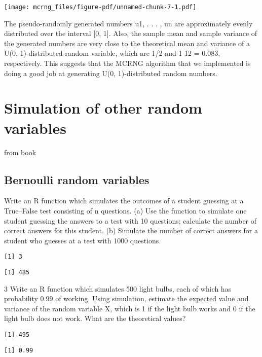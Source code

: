 \documentclass[
  letterpaper,
  DIV=11,
  numbers=noendperiod]{scrreprt}
\begin{document}
\texttt{[image: mcrng\_files/figure-pdf/unnamed-chunk-7-1.pdf]}

The pseudo-randomly generated numbers u1, . . . , un are approximately
evenly distributed over the interval {[}0, 1{]}. Also, the sample mean
and sample variance of the generated numbers are very close to the
theoretical mean and variance of a U(0, 1)-distributed random variable,
which are 1/2 and 1 12 = 0.083, respectively. This suggests that the
MCRNG algorithm that we implemented is doing a good job at generating
U(0, 1)-distributed random numbers.

\section{Simulation of other random
variables}\label{simulation-of-other-random-variables}

from book

\subsection{Bernoulli random
variables}\label{bernoulli-random-variables}

Write an R function which simulates the outcomes of a student guessing
at a True--False test consisting of n questions. (a) Use the function to
simulate one student guessing the answers to a test with 10 questions;
calculate the number of correct answers for this student. (b) Simulate
the number of correct answers for a student who guesses at a test with
1000 questions.

\begin{verbatim}
[1] 3
\end{verbatim}

\begin{verbatim}
[1] 485
\end{verbatim}

3 Write an R function which simulates 500 light bulbs, each of which has
probability 0.99 of working. Using simulation, estimate the expected
value and variance of the random variable X, which is 1 if the light
bulb works and 0 if the light bulb does not work. What are the
theoretical values?

\begin{verbatim}
[1] 495
\end{verbatim}

\begin{verbatim}
[1] 0.99
\end{verbatim}
\end{document}
